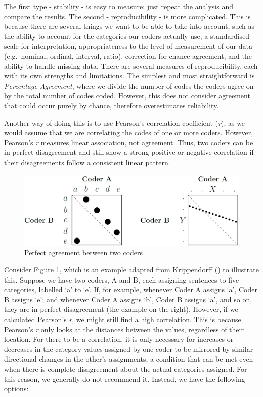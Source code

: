 \documentclass[
]{book}
\begin{document}
The first type - stability - is easy to measure: just repeat the analysis and compare the results. The second - reproducibility - is more complicated. This is because there are several things we want to be able to take into account, such as the ability to account for the categories our coders actually use, a standardised scale for interpretation, appropriateness to the level of measurement of our data (e.g.~nominal, ordinal, interval, ratio), correction for chance agreement, and the ability to handle missing data. There are several measures of reproducibility, each with its own strengths and limitations. The simplest and most straightforward is \emph{Percentage Agreement}, where we divide the number of codes the coders agree on by the total number of codes coded. However, this does not consider agreement that could occur purely by chance, therefore overestimates reliability.

Another way of doing this is to use Pearson's correlation coefficient (\emph{r}), as we would assume that we are correlating the codes of one or more coders. However, Pearson's \emph{r} measures linear association, not agreement. Thus, two coders can be in perfect disagreement and still show a strong positive or negative correlation if their disagreements follow a consistent linear pattern.

\begin{figure}
\includegraphics[width=1\linewidth]{figure/observers} \caption{Perfect agreement between two coders}\label{fig:coders}
\end{figure}

Consider Figure \ref{fig:coders}, which is an example adapted from Krippendorff () to illustrate this. Suppose we have two coders, A and B, each assigning sentences to five categories, labelled `a' to `e'. If, for example, whenever Coder A assigns `a', Coder B assigns `e'; and whenever Coder A assigns `b', Coder B assigns `a', and so on, they are in perfect disagreement (the example on the right). However, if we calculated Pearson's \emph{r}, we might still find a high correlation. This is because Pearson's \emph{r} only looks at the distances between the values, regardless of their location. For there to be a correlation, it is only necessary for increases or decreases in the category values assigned by one coder to be mirrored by similar directional changes in the other's assignments, a condition that can be met even when there is complete disagreement about the actual categories assigned. For this reason, we generally do not recommend it. Instead, we have the following options:
\end{document}
